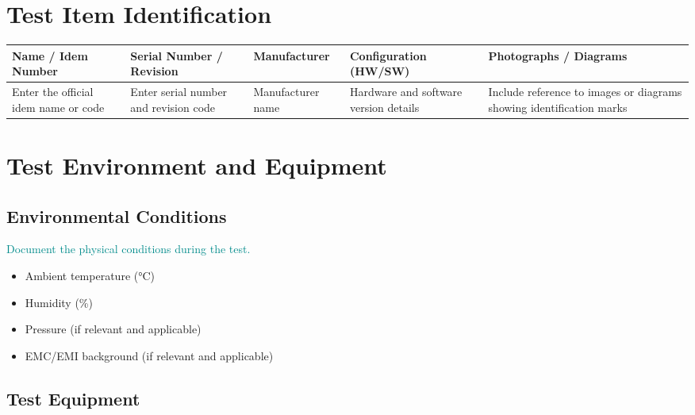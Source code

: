 \documentclass{common/latex/delta_base_styles/delta_base_styles}
\begin{document}
\section{Test Item Identification}

\renewcommand{\arraystretch}{1.3} 
\setlength{\tabcolsep}{3pt}      

\begin{tabular}{|>{\centering\arraybackslash}m{2.9cm}
                |>{\centering\arraybackslash}m{2.9cm}
                |>{\centering\arraybackslash}m{2.9cm}
                |>{\centering\arraybackslash}m{2.9cm}
                |>{\centering\arraybackslash}m{3.2cm}|}
\hline
\textbf{Name / Idem Number} & \textbf{Serial Number / Revision} & \textbf{Manufacturer} & \textbf{Configuration (HW/SW)} & \textbf{Photographs / Diagrams} \\ 
\hline
Enter the official idem name or code 
& Enter serial number and revision code 
& Manufacturer name 
& Hardware and software version details 
& Include reference to images or diagrams showing identification marks \\
\hline
\end{tabular}

\section{Test Environment and Equipment}

\subsection{Environmental Conditions}

\textcolor{DarkCyan} {Document the physical conditions during the test.}
\begin{itemize}
    \item Ambient temperature (°C)
    \item Humidity (\%)
    \item Pressure (if relevant and applicable)
    \item EMC/EMI background (if relevant and applicable)
\end{itemize}

\subsection{Test Equipment}

\end{document}
